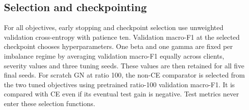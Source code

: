 \subsection{Selection and checkpointing}
For all objectives, early stopping and checkpoint selection use unweighted validation cross-entropy with patience ten. Validation macro-F1 at the selected checkpoint chooses hyperparameters. One beta and one gamma are fixed per imbalance regime by averaging validation macro-F1 equally across clients, severity values and three tuning seeds. These values are then retained for all five final seeds. For scratch GN at ratio 100, the non-CE comparator is selected from the two tuned objectives using pretrained ratio-100 validation macro-F1. It is compared with CE even if its eventual test gain is negative. Test metrics never enter these selection functions.
